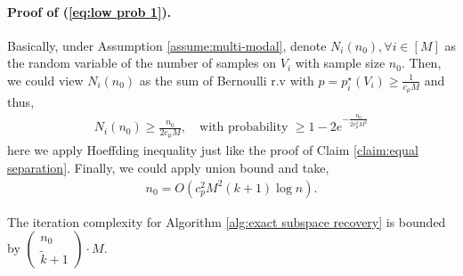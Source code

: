 \documentclass{article}
\theoremstyle{plain}
\theoremstyle{remark}
\begin{document}
\paragraph*{Proof of (\ref{eq:low prob 1}).} 
Basically, under Assumption \ref{assume:multi-modal}, denote $N_i(n_0), \forall i \in [M]$ as the random variable of the number of samples on $V_i$ with sample size $n_0$. Then, we could view $N_i(n_0)$ as the sum of Bernoulli r.v with $p=p_i^\star(V_i)\geq \frac{1}{c_{\mu}M}$ and thus, 
\begin{align*}
    N_i(n_0) \geq \frac{n_0}{2c_{\mu}M}, \quad \text{with probability }\geq 1-2e^{-\frac{n_0}{2c_{\mu}^2M^2}}
\end{align*}
here we apply Hoeffding inequality just like the proof of Claim \ref{claim:equal separation}. Finally, we could apply union bound and take, 
\begin{align*}
    n_0 = O(c_{p}^2M^2(k+1) \log n) .
\end{align*}

The iteration complexity for Algorithm \ref{alg:exact subspace recovery} is bounded by $\begin{pmatrix}
    n_0\\
    \widetilde{k}+1
\end{pmatrix}\cdot M$. 
\end{document}

